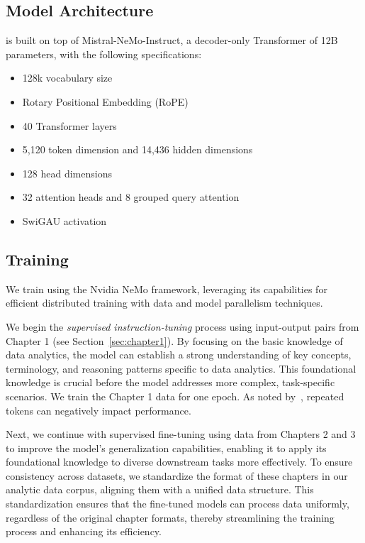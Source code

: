 \subsection{Model Architecture}

\modelname is built on top of Mistral-NeMo-Instruct, a decoder-only Transformer of 12B parameters, with the following specifications:
\begin{itemize}
    \item 128k vocabulary size
    \item Rotary Positional Embedding (RoPE)~\citep{su2024roformer}
    \item 40 Transformer layers~\citep{vaswani2017attention}
    \item 5,120 token dimension and 14,436 hidden dimensions
    \item 128 head dimensions
    \item 32 attention heads and 8 grouped query attention~\citep{ainslie2023gqa}
    \item SwiGAU activation~\citep{shazeer2020glu}
\end{itemize}

\subsection{\modelname Training}

We train \modelname using the Nvidia NeMo framework, leveraging its capabilities for efficient distributed training with data and model parallelism techniques. 

We begin the \textit{supervised instruction-tuning} process using input-output pairs from Chapter 1 (see Section~\ref{sec:chapter1}). By focusing on the basic knowledge of data analytics, the model can establish a strong understanding of key concepts, terminology, and reasoning patterns specific to data analytics. This foundational knowledge is crucial before the model addresses more complex, task-specific scenarios. We train the Chapter 1 data for one epoch. As noted by~\citet{hernandez2022scaling}, repeated tokens can negatively impact performance.

Next, we continue with supervised fine-tuning using data from Chapters 2 and 3 to improve the model's generalization capabilities, enabling it to apply its foundational knowledge to diverse downstream tasks more effectively. To ensure consistency across datasets, we standardize the format of these chapters in our analytic data corpus, aligning them with a unified data structure. This standardization ensures that the fine-tuned models can process data uniformly, regardless of the original chapter formats, thereby streamlining the training process and enhancing its efficiency.


